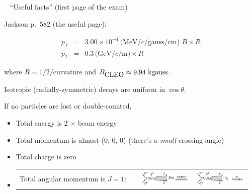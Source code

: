 \documentclass[landscape]{article}
\newenvironment{slide}{\mbox{ }\vfill}{\vfill \mbox{ } \pagebreak}
\begin{document}
\begin{slide}
``Useful facts'' (first page of the exam)

\vfill
Jackson p.\ 582 (the useful page):

\vspace{-1 cm}
\begin{eqnarray*}
p_T &=& 3.00 \times 10^{-4} \, \mbox{(MeV/$c$/gauss/cm) } B \times R \\
p_T &=& 0.3 \, \mbox{(GeV/$c$/m)} \times R
\end{eqnarray*}

where $R = 1/2/$curvature and $B_{\mbox{\normalsize CLEO}} \approx
9.94 \mbox{ kgauss}$.

\vfill
Isotropic (radially-symmetric) decays are uniform in $\cos\theta$.

\vfill
If no particles are lost or double-counted,
\begin{itemize}
  \item Total energy is 2 $\times$ beam energy
  \item Total momentum is almost (0, 0, 0) (there's a {\it small} crossing angle)
  \item Total charge is zero
  \item \begin{tabular}{p{0.5\linewidth} p{0.23\linewidth} p{0.23\linewidth}}
    \mbox{\hspace{-0.4 cm}} \begin{minipage}{\linewidth} Total angular momentum is $J=1$: \end{minipage} &
    \begin{minipage}{\linewidth} \includegraphics[width=\linewidth]{diagram_jpsi} \end{minipage} &
    \begin{minipage}{\linewidth} \includegraphics[width=\linewidth]{diagram_etac} \end{minipage}
  \end{tabular}
\end{itemize}

\end{slide}
\end{document}
